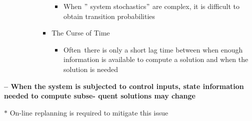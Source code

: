 \documentclass[12pt,twoside]{article}
\begin{document}
\begin{itemize}
\begin{itemize}
\begin{itemize}
\begin{itemize}
\begin{itemize}
	\item {\fontsize{10pt}{12.0pt}\selectfont When $"$ system stochastics$"$  are complex, it is difficult to obtain transition probabilities\par}\par


\end{itemize}
	\item {\fontsize{10pt}{12.0pt}\selectfont The Curse of Time\par}\par

\begin{itemize}
	\item {\fontsize{10pt}{12.0pt}\selectfont Often\ there is only a short lag time between when enough information is available to compute  a solution and when the solution is needed\par}\par


\vspace{\baselineskip}

\end{itemize}
\end{itemize}
\end{itemize}
\end{itemize}
\end{itemize}
\vspace{\baselineskip}
{\fontsize{10pt}{12.0pt}\selectfont \textbf{– When the system is subjected to control inputs, state information needed to compute subse- quent solutions may change}\par}\par

{\fontsize{10pt}{12.0pt}\selectfont $\ast$  On-line replanning is required to mitigate this issue\par}\par
\end{document}
